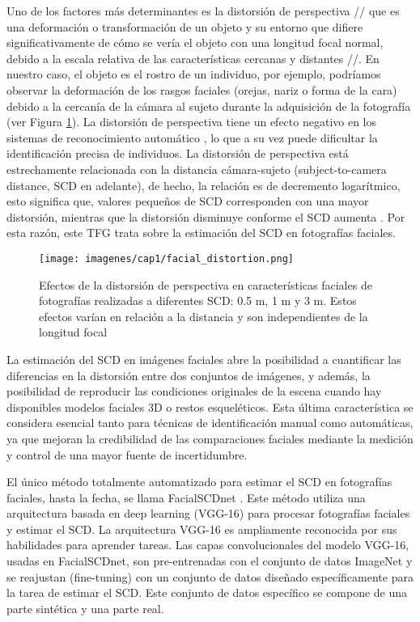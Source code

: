 Uno de los factores más determinantes es la distorsión de perspectiva \cite{8} // que es una deformación o transformación de un objeto y su entorno que difiere significativamente de cómo se vería el objeto con una longitud focal normal, debido a la escala relativa de las características cercanas y distantes //. En nuestro caso, el objeto es el rostro de un individuo, por ejemplo, podríamos observar la deformación de los rasgos faciales (orejas, nariz o forma de la cara) debido a la cercanía de la cámara al sujeto durante la adquisición de la fotografía \cite{12} (ver Figura \ref{fig1}). La distorsión de perspectiva tiene un efecto negativo en los sistemas de reconocimiento automático \cite{9,10,11}, lo que a su vez puede dificultar la identificación precisa de individuos. La distorsión de perspectiva está estrechamente relacionada con la distancia cámara-sujeto (subject-to-camera distance, SCD en adelante), de hecho, la relación es de decremento logarítmico, esto significa que, valores pequeños de SCD corresponden con una mayor distorsión, mientras que la distorsión disminuye conforme el SCD aumenta \cite{23}. Por esta razón, este TFG trata sobre la estimación del SCD en fotografías faciales.

\begin{figure}[h]
	\centering
	\texttt{[image: imagenes/cap1/facial\_distortion.png]}
	\caption{Efectos de la distorsión de perspectiva en características faciales de fotografías realizadas a diferentes SCD: 0.5 m, 1 m y 3 m. Estos efectos varían en relación a la distancia y son independientes de la longitud focal \cite{14}}
	\label{fig1}
\end{figure}


La estimación del SCD en imágenes faciales abre la posibilidad a cuantificar las diferencias en la distorsión entre dos conjuntos de imágenes, y además, la posibilidad de reproducir las condiciones originales de la escena cuando hay disponibles modelos faciales 3D o restos esqueléticos. Esta última característica se considera esencial tanto para técnicas de identificación manual como automáticas, ya que mejoran la credibilidad de las comparaciones faciales mediante la medición y control de una mayor fuente de incertidumbre.

El único método totalmente automatizado para estimar el SCD en fotografías faciales, hasta la fecha, se llama FacialSCDnet \cite{14}. Este método utiliza una arquitectura basada en deep learning (VGG-16) para procesar fotografías faciales y estimar el SCD. La arquitectura VGG-16 es ampliamente reconocida por sus habilidades para aprender tareas. Las capas convolucionales del modelo VGG-16, usadas en FacialSCDnet, son pre-entrenadas con el conjunto de datos ImageNet y se reajustan (fine-tuning) con un conjunto de datos diseñado específicamente para la tarea de estimar el SCD. Este conjunto de datos específico se compone de una parte sintética y una parte real.

